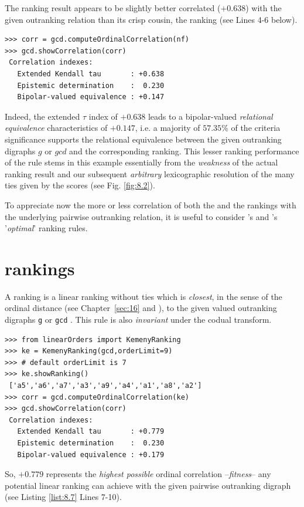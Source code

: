 The \NetFlows ranking result appears to be slightly better correlated ($+0.638$) with the given outranking relation than its crisp cousin, the \Copeland ranking (see Lines 4-6 below).
\begin{lstlisting}[caption={Checking the quality of the \NetFlows Ranking},label=list:8.6]   
>>> corr = gcd.computeOrdinalCorrelation(nf)
>>> gcd.showCorrelation(corr)
 Correlation indexes:
   Extended Kendall tau       : +0.638
   Epistemic determination    :  0.230
   Bipolar-valued equivalence : +0.147
\end{lstlisting}
Indeed, the extended \Kendall $\tau$ index of $+0.638$ leads to a bipolar-valued \emph{relational equivalence} characteristics of $+0.147$, i.e. a majority of $57.35\%$ of the criteria significance supports the relational equivalence between the given outranking digraphs $g$ or $gcd$  and the corresponding \NetFlows ranking. This lesser ranking performance of the \Copeland rule stems in this example essentially from the \emph{weakness} of the actual ranking result and our subsequent \emph{arbitrary} lexicographic resolution of the many ties given by the \Copeland scores (see Fig. \ref{fig:8.2}).

To appreciate now the more or less correlation of both the \Copeland and the \NetFlows rankings with the underlying pairwise outranking relation, it is useful to consider \Kemeny 's and \Slater 's '\emph{optimal}' ranking rules.

\section{\Kemeny rankings}
\label{sec:8.4}

A \Kemeny ranking is a linear ranking without ties which is \emph{closest}, in the sense of the ordinal \Kendall distance (see Chapter~\ref{sec:16} and \citet{BIS-2012a}), to the given valued outranking digraphs \texttt{g} or \texttt{gcd} \citep{KEM-1959}. This rule is also \emph{invariant} under the codual transform. 
\begin{lstlisting}[caption={Computing a \Kemeny ranking},label=list:8.7]   
>>> from linearOrders import KemenyRanking
>>> ke = KemenyRanking(gcd,orderLimit=9)
>>> # default orderLimit is 7
>>> ke.showRanking()
 ['a5','a6','a7','a3','a9','a4','a1','a8','a2']
>>> corr = gcd.computeOrdinalCorrelation(ke)
>>> gcd.showCorrelation(corr)
 Correlation indexes:
   Extended Kendall tau       : +0.779
   Epistemic determination    :  0.230
   Bipolar-valued equivalence : +0.179
\end{lstlisting}    
So, $+0.779$ represents the \emph{highest possible} ordinal correlation --\emph{fitness}-- any potential linear ranking can achieve with the given pairwise outranking digraph (see Listing \ref{list:8.7} Lines 7-10).

